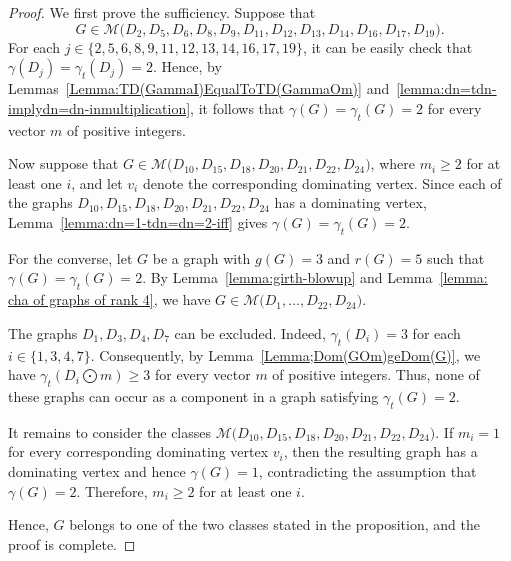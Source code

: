 \documentclass[12pt]{amsart}
\theoremstyle{plain}
\theoremstyle{definition}
\begin{document}
\begin{proof}
We first prove the sufficiency. Suppose that
\[G\in\mathcal{M}\bigl(D_2,D_5,D_6,D_8,D_9,D_{11},D_{12},D_{13},D_{14},D_{16},D_{17},D_{19}\bigr).\]
For each
$j\in\{2,5,6,8,9,11,12,13,14,16,17,19\}$,
it can be easily check that $\gamma(D_j)=\gamma_t(D_j)=2$. Hence, by Lemmas~\ref{Lemma:TD(GammaI)EqualToTD(GammaOm)} and~\ref{lemma:dn=tdn-implydn=dn-inmultiplication}, it follows that
$\gamma(G)=\gamma_t(G)=2$ for every vector $m$ of positive integers.

Now suppose that
$G\in\mathcal{M}\bigl(D_{10},D_{15},D_{18},D_{20},D_{21},D_{22},D_{24}\bigr)$,
where $m_i\geq2$ for at least one $i$, and let $v_i$ denote the corresponding dominating vertex. Since each of the graphs $D_{10},D_{15},D_{18},D_{20},D_{21},D_{22},D_{24}$ has a dominating vertex, Lemma~\ref{lemma:dn=1-tdn=dn=2-iff} gives
$\gamma(G)=\gamma_t(G)=2$.

For the converse, let $G$ be a graph with $g(G)=3$ and $r(G)=5$ such that $\gamma(G)=\gamma_t(G)=2$. By Lemma~\ref{lemma:girth-blowup} and Lemma~\ref{lemma: cha of graphs of rank 4}, we have
$G\in\mathcal{M}\bigl(D_1,\ldots,D_{22},D_{24}\bigr)$.

The graphs $D_1,D_3,D_4,D_7$ can be excluded. Indeed,
$\gamma_t(D_i)=3$ for each $i\in\{1,3,4,7\}$. Consequently, by Lemma~\ref{Lemma;Dom(GOm)geDom(G)}, we have
$\gamma_t(D_i\bigodot m)\geq3$
for every vector $m$ of positive integers. Thus, none of these graphs can occur as a component in a graph satisfying $\gamma_t(G)=2$.

It remains to consider the classes
$\mathcal{M}\bigl(D_{10},D_{15},D_{18},D_{20},D_{21},D_{22},D_{24}\bigr)$.
If $m_i=1$ for every corresponding dominating vertex $v_i$, then the resulting graph has a dominating vertex and hence $\gamma(G)=1$, contradicting the assumption that $\gamma(G)=2$. Therefore, $m_i\geq2$ for at least one $i$.

Hence, $G$ belongs to one of the two classes stated in the proposition, and the proof is complete.
\end{proof}
\end{document}
